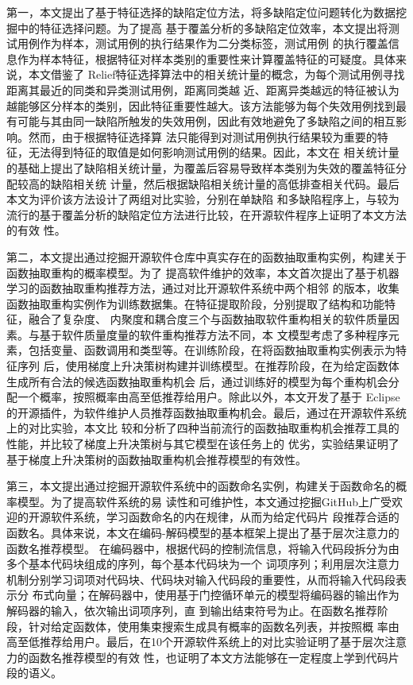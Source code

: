 第一，本文提出了基于特征选择的缺陷定位方法，将多缺陷定位问题转化为数据挖掘中的特征选择问题。为了提高
基于覆盖分析的多缺陷定位效率，本文提出将测试用例作为样本，测试用例的执行结果作为二分类标签，测试用例
的执行覆盖信息作为样本特征，根据特征对样本类别的重要性来计算覆盖特征的可疑度。具体来说，本文借鉴了
Relief特征选择算法中的相关统计量的概念，为每个测试用例寻找距离其最近的同类和异类测试用例，距离同类越
近、距离异类越远的特征被认为越能够区分样本的类别，因此特征重要性越大。该方法能够为每个失效用例找到最
有可能与其由同一缺陷所触发的失效用例，因此有效地避免了多缺陷之间的相互影响。然而，由于根据特征选择算
法只能得到对测试用例执行结果较为重要的特征，无法得到特征的取值是如何影响测试用例的结果。因此，本文在
相关统计量的基础上提出了缺陷相关统计量，为覆盖后容易导致样本类别为失效的覆盖特征分配较高的缺陷相关统
计量，然后根据缺陷相关统计量的高低排查相关代码。最后本文为评价该方法设计了两组对比实验，分别在单缺陷
和多缺陷程序上，与较为流行的基于覆盖分析的缺陷定位方法进行比较，在开源软件程序上证明了本文方法的有效
性。

第二，本文提出通过挖掘开源软件仓库中真实存在的函数抽取重构实例，构建关于函数抽取重构的概率模型。为了
提高软件维护的效率，本文首次提出了基于机器学习的函数抽取重构推荐方法，通过对比开源软件系统中两个相邻
的版本，收集函数抽取重构实例作为训练数据集。在特征提取阶段，分别提取了结构和功能特征，融合了复杂度、
内聚度和耦合度三个与函数抽取软件重构相关的软件质量因素。与基于软件质量度量的软件重构推荐方法不同，本
文模型考虑了多种程序元素，包括变量、函数调用和类型等。在训练阶段，在将函数抽取重构实例表示为特征序列
后，使用梯度上升决策树构建并训练模型。在推荐阶段，在为给定函数体生成所有合法的候选函数抽取重构机会
后，通过训练好的模型为每个重构机会分配一个概率，按照概率由高至低推荐给用户。除此以外，本文开发了基于
Eclipse的开源插件，为软件维护人员推荐函数抽取重构机会。最后，通过在开源软件系统上的对比实验，本文比
较和分析了四种当前流行的函数抽取重构机会推荐工具的性能，并比较了梯度上升决策树与其它模型在该任务上的
优劣，实验结果证明了基于梯度上升决策树的函数抽取重构机会推荐模型的有效性。

第三，本文提出通过挖掘开源软件系统中的函数命名实例，构建关于函数命名的概率模型。为了提高软件系统的易
读性和可维护性，本文通过挖掘GitHub上广受欢迎的开源软件系统，学习函数命名的内在规律，从而为给定代码片
段推荐合适的函数名。具体来说，本文在编码-解码模型的基本框架上提出了基于层次注意力的函数名推荐模型。
在编码器中，根据代码的控制流信息，将输入代码段拆分为由多个基本代码块组成的序列，每个基本代码块为一个
词项序列；利用层次注意力机制分别学习词项对代码块、代码块对输入代码段的重要性，从而将输入代码段表示分
布式向量；在解码器中，使用基于门控循环单元的模型将编码器的输出作为解码器的输入，依次输出词项序列，直
到输出结束符号为止。在函数名推荐阶段，针对给定函数体，使用集束搜索生成具有概率的函数名列表，并按照概
率由高至低推荐给用户。最后，在10个开源软件系统上的对比实验证明了基于层次注意力的函数名推荐模型的有效
性，也证明了本文方法能够在一定程度上学到代码片段的语义。

